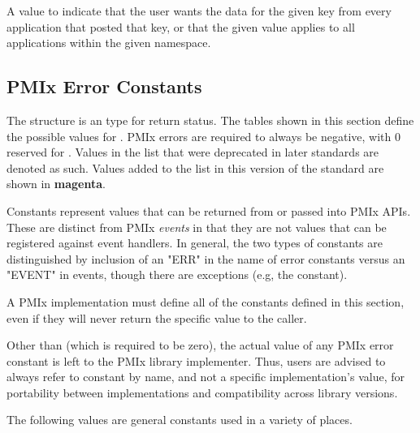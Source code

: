 \begin{constantdesc}
%
A value to indicate that the user wants the data for the given key from every application that posted that key, or that the given value applies to all applications within the given namespace.
\end{constantdesc}


\subsection{PMIx Error Constants}
\label{api:struct:errors}

The  structure is an  type for return status. The tables shown in this section define the possible values for .
PMIx errors are required to always be negative, with 0 reserved for . Values in the list that were deprecated in later standards are denoted as such. Values added to the list in this version of the standard are shown in \textbf{\color{magenta}magenta}.

Constants represent values that can be returned from or passed into \ac{PMIx}
\acp{API}. These are distinct from \ac{PMIx} \emph{events} in that they are
not values that can be registered against event handlers. In general, the two
types of constants are distinguished by inclusion of an "ERR" in the name of
error constants versus an "EVENT" in events, though there are exceptions (e.g,
the  constant).

\adviceimplstart
A PMIx implementation must define all of the constants defined in this section, even if they will never return the specific value to the caller.
\adviceimplend

\adviceuserstart
Other than  (which is required to be zero), the actual value of any \ac{PMIx} error constant is left to the \ac{PMIx} library implementer. Thus, users are advised to always refer to constant by name, and not a specific implementation's value, for portability between implementations and compatibility across library versions.
\adviceuserend

The following values are general constants used in a variety of places.

